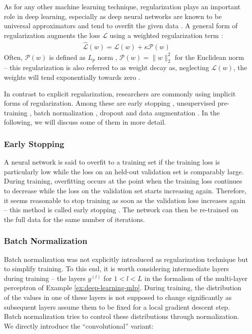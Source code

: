 As for any other machine learning technique, regularization plays an important
role in deep learning, especially as deep neural networks are known to be
universal approximators \cite{HornikStinchcombeWhite:1989} and tend to overfit
the given data \cite{Bengio:2009}. A general form of regularization
augments the loss $\mathcal{L}$
using a weighted regularization term \cite[Section~9.2]{Bishop:1995}:
\begin{align}
  \hat{\mathcal{L}}(w) = \mathcal{L}(w) + \kappa \mathcal{P}(w)
\end{align}
Often, $\mathcal{P}(w)$ is defined as $L_p$ norm \cite{Bishop:1995}, \eg
$\mathcal{P}(w) = \|w\|_2^2$ for the Euclidean norm -- this regularization is
also referred to as weight decay as, neglecting $\mathcal{L}(w)$, the weights
will tend exponentially towards zero \cite[Section~9.2]{Bishop:1995}.

In contrast to explicit regularization, researchers are commonly using 
implicit forms of regularization. Among these are early
stopping \cite[Section~9.2]{Bishop:1995}, unsupervised
pre-training \cite{ErhanBengioCourville:2010},
batch normalization \cite{IoffeSzegedy:2015}, dropout
\cite{SrivastavaHinton:2014} and data augmentation
\cite[Section~7.4]{GoodfellowBengioCourville:2016}. In the following,
we will discuss some of them in more detail.

\subsubsection{Early Stopping}

A neural network is said to overfit to a training set if the training loss
is particularly low while the loss on an held-out validation set is comparably large.
During training, overfitting occurs at the point when the training loss continues
to decrease while the loss on the validation set starts increasing again.
Therefore, it seems reasonable to stop training as soon as the validation loss
increases again -- this method is called early stopping \cite[Section~9.2]{Bishop:1995}.
The network can then be re-trained on the full data for the same number
of iterations.

\subsubsection{Batch Normalization}

Batch normalization \cite{IoffeSzegedy:2015} was not explicitly introduced
as regularization technique but to simplify training. To this end, it is worth
considering intermediate layers during training -- \ie the layers
$y^{(l)}$ for $1 < l < L$ in the formalism of the multi-layer perceptron
of Example \ref{ex:deep-learning-mlp}. During training, the distribution of the values
in one of these layers is not supposed to change significantly as subsequent
layers assume them to be fixed for a local gradient descent step.
Batch normalization tries to control these distributions
through normalization. We directly introduce the ``convolutional'' variant:

